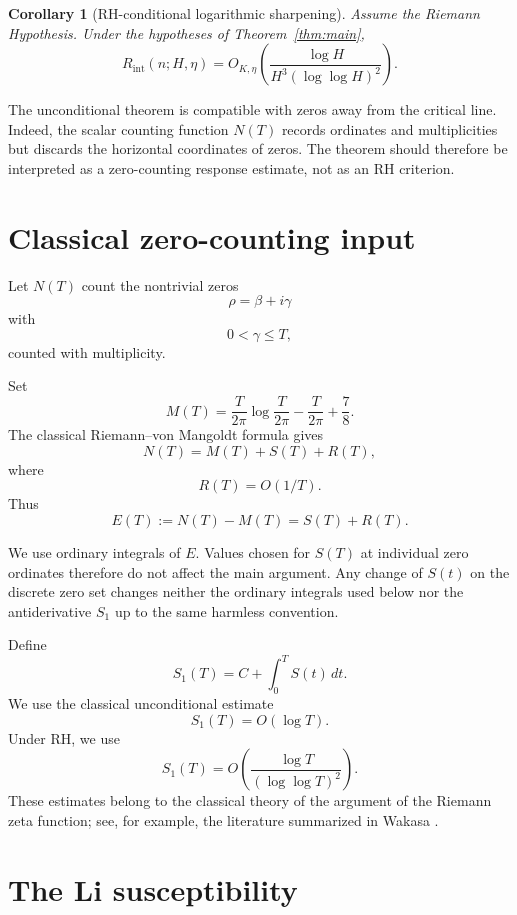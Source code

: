 \documentclass[11pt]{article}
\newtheorem{corollary}[theorem]{Corollary}
\newcommand{\Rint}{R_{\mathrm{int}}}
\begin{document}
\begin{corollary}[RH-conditional logarithmic sharpening]
\label{cor:rh}
Assume the Riemann Hypothesis. Under the hypotheses of
Theorem~\ref{thm:main},
\[
\Rint(n;H,\eta)
=
O_{K,\eta}
\left(
\frac{\log H}
{H^3(\log\log H)^2}
\right).
\]
\end{corollary}

The unconditional theorem is compatible with zeros away from the
critical line. Indeed, the scalar counting function \(N(T)\) records
ordinates and multiplicities but discards the horizontal coordinates
of zeros. The theorem should therefore be interpreted as a
zero-counting response estimate, not as an RH criterion.

\section{Classical zero-counting input}

Let \(N(T)\) count the nontrivial zeros
\[
\rho=\beta+i\gamma
\]
with
\[
0<\gamma\le T,
\]
counted with multiplicity.

Set
\[
M(T)
=
\frac{T}{2\pi}
\log\frac{T}{2\pi}
-
\frac{T}{2\pi}
+
\frac78.
\]
The classical Riemann--von Mangoldt formula gives
\[
N(T)
=
M(T)+S(T)+R(T),
\]
where
\[
R(T)=O(1/T).
\]
Thus
\[
E(T)
:=
N(T)-M(T)
=
S(T)+R(T).
\]

We use ordinary integrals of \(E\). Values chosen for \(S(T)\) at
individual zero ordinates therefore do not affect the main argument.
Any change of \(S(t)\) on the discrete zero set changes neither the
ordinary integrals used below nor the antiderivative \(S_1\) up to the
same harmless convention.

Define
\[
S_1(T)
=
C+\int_0^T S(t)\,dt.
\]
We use the classical unconditional estimate
\begin{equation}
\label{eq:s1-unconditional}
S_1(T)=O(\log T).
\end{equation}
Under RH, we use
\begin{equation}
\label{eq:s1-rh}
S_1(T)
=
O
\left(
\frac{\log T}
{(\log\log T)^2}
\right).
\end{equation}
These estimates belong to the classical theory of the argument of the
Riemann zeta function; see, for example, the literature summarized in
Wakasa \cite{WakasaS1}.

\section{The Li susceptibility}
\end{document}
